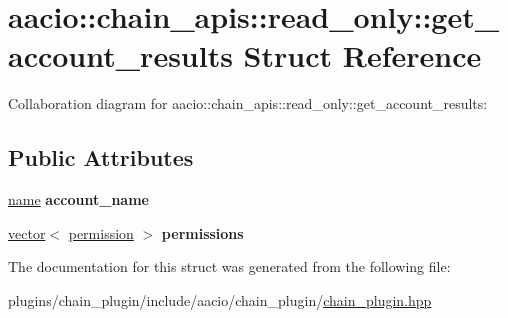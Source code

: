 \hypertarget{structaacio_1_1chain__apis_1_1read__only_1_1get__account__results}{}\section{aacio\+:\+:chain\+\_\+apis\+:\+:read\+\_\+only\+:\+:get\+\_\+account\+\_\+results Struct Reference}
\label{structaacio_1_1chain__apis_1_1read__only_1_1get__account__results}


Collaboration diagram for aacio\+:\+:chain\+\_\+apis\+:\+:read\+\_\+only\+:\+:get\+\_\+account\+\_\+results\+:
\subsection*{Public Attributes}
\begin{DoxyCompactItemize}
\item 
\mbox{\label{structaacio_1_1chain__apis_1_1read__only_1_1get__account__results_a2a20e688c8a62d8111895ad854668c0e}} 
\mbox{\hyperlink{structaacio_1_1name}{name}} {\bfseries account\+\_\+name}
\item 
\mbox{\label{structaacio_1_1chain__apis_1_1read__only_1_1get__account__results_a0417c7eadb054449b8a33051c4c11c50}} 
\mbox{\hyperlink{classstd_1_1vector}{vector}}$<$ \mbox{\hyperlink{structaacio_1_1chain__apis_1_1permission}{permission}} $>$ {\bfseries permissions}
\end{DoxyCompactItemize}


The documentation for this struct was generated from the following file\+:\begin{DoxyCompactItemize}
\item 
plugins/chain\+\_\+plugin/include/aacio/chain\+\_\+plugin/\mbox{\hyperlink{chain__plugin_8hpp}{chain\+\_\+plugin.\+hpp}}\end{DoxyCompactItemize}
